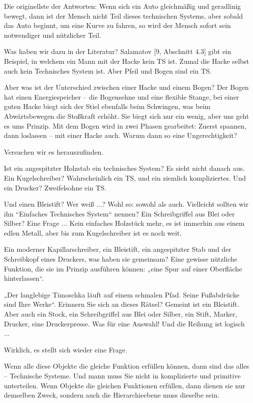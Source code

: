 \documentclass[11pt,a4paper]{article}
\begin{document}
Die originellste der Antworten: Wenn sich ein Auto gleichmäßig und geradlinig
bewegt, dann ist der Mensch nicht Teil dieses technischen Systems, aber sobald
das Auto beginnt, um eine Kurve zu fahren, so wird der Mensch sofort sein
notwendiger und nützlicher Teil.

Was haben wir dazu in der Literatur? Salamatov [9, Abschnitt 4.3] gibt ein
Beispiel, in welchem ein Mann mit der Hacke kein TS ist. Zumal die Hacke
selbst auch kein Technisches System ist. Aber Pfeil und Bogen sind ein TS.

Aber was ist der Unterschied zwischen einer Hacke und einem Bogen? Der Bogen
hat einen Energiespeicher -- die Bogensehne und eine flexible Stange, bei
einer guten Hacke biegt sich der Stiel ebenfalls beim Schwingen, was beim
Abwärtsbewegen die Stoßkraft erhöht. Sie biegt sich nur ein wenig, aber uns
geht es ums Prinzip. Mit dem Bogen wird in zwei Phasen gearbeitet: Zuerst
spannen, dann loslassen -- mit einer Hacke auch. Warum dann so eine
Ungerechtigkeit?

Versuchen wir es herauszufinden. 

Ist ein angespitzter Holzstab ein technisches System? Es sieht nicht danach
aus.  Ein Kugelschreiber? Wahrscheinlich ein TS, und ein ziemlich
kompliziertes. Und ein Drucker?  Zweifelsohne ein TS.

Und einen Bleistift? Wer weiß ...? Wohl so: sowohl als auch. Vielleicht
sollten wir ihn “Einfaches Technisches System“ nennen? Ein Schreibgriffel aus
Blei oder Silber? Eine Frage ...  Kein einfaches Holzstück mehr, es ist
immerhin aus einem edlen Metall, aber bis zum Kugelschreiber ist es noch weit.

Ein moderner Kapillarschreiber, ein Bleistift, ein angespitzter Stab und der
Schreibkopf eines Druckers, was haben sie gemeinsam? Eine gewisse nützliche
Funktion, die sie im Prinzip ausführen können: „eine Spur auf einer Oberfläche
hinterlassen“.

„Der langlebige Timoschka läuft auf einem schmalen Pfad. Seine Fußabdrücke
sind Ihre Werke“. Erinnern Sie sich an dieses Rätsel? Gemeint ist ein
Bleistift.  Aber auch ein Stock, ein Schreibgriffel aus Blei oder Silber, ein
Stift, Marker, Drucker, eine Druckerpresse. Was für eine Auswahl! Und die
Reihung ist logisch ...

Wirklich, es stellt sich wieder eine Frage. 

Wenn alle diese Objekte die gleiche Funktion erfüllen können, dann sind das
alles -- Technische Systeme. Und mann muss Sie nicht in komplizierte und
primitive unterteilen. Wenn Objekte die gleichen Funktionen erfüllen, dann
dienen sie nur demselben Zweck, sondern auch die Hierarchieebene muss dieselbe
sein.
\end{document}
